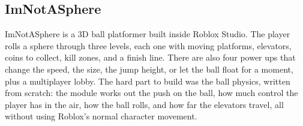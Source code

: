 \documentclass[12pt,letterpaper]{article}
\begin{document}
\clearpage

\subsection{ImNotASphere}

ImNotASphere is a 3D ball platformer built inside Roblox Studio. The player rolls a sphere through three levels, each one with moving platforms, elevators, coins to collect, kill zones, and a finish line. There are also four power ups that change the speed, the size, the jump height, or let the ball float for a moment, plus a multiplayer lobby. The hard part to build was the ball physics, written from scratch: the module works out the push on the ball, how much control the player has in the air, how the ball rolls, and how far the elevators travel, all without using Roblox's normal character movement.
\end{document}
